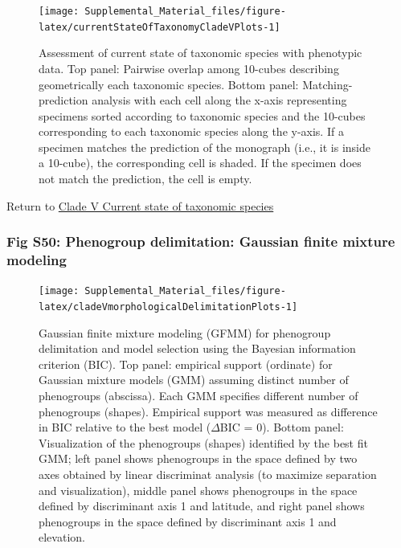 \documentclass[
  11pt,
]{article}
\begin{document}
\begin{figure}
\texttt{[image: Supplemental\_Material\_files/figure-latex/currentStateOfTaxonomyCladeVPlots-1]} \caption{Assessment of current state of taxonomic species with phenotypic data. Top panel: Pairwise overlap among 10-cubes describing geometrically each taxonomic species. Bottom panel: Matching-prediction analysis with each cell along the x-axis representing specimens sorted according to taxonomic species and the 10-cubes corresponding to each taxonomic species along the y-axis. If a specimen matches the prediction of the monograph (i.e., it is inside a 10-cube), the corresponding cell is shaded. If the specimen does not match the prediction, the cell is empty.}\label{fig:currentStateOfTaxonomyCladeVPlots}
\end{figure}

Return to \protect\hyperlink{current-state-of-taxonomic-species-4}{Clade V Current state of taxonomic species}
\pagebreak

\hypertarget{fig-s50-phenogroup-delimitation-gaussian-finite-mixture-modeling}{%
\subsubsection{Fig S50: Phenogroup delimitation: Gaussian finite mixture modeling}\label{fig-s50-phenogroup-delimitation-gaussian-finite-mixture-modeling}}

\begin{figure}
\texttt{[image: Supplemental\_Material\_files/figure-latex/cladeVmorphologicalDelimitationPlots-1]} \caption{Gaussian finite mixture modeling (GFMM) for phenogroup delimitation and model selection using the Bayesian information criterion (BIC). Top panel: empirical support (ordinate) for Gaussian mixture models (GMM) assuming distinct number of phenogroups (abscissa). Each GMM specifies different number of phenogroups (shapes). Empirical support was measured as difference in BIC relative to the best model ($\Delta$BIC = $0$). Bottom panel: Visualization of the phenogroups (shapes) identified by the best fit GMM; left panel shows phenogroups in the space defined by two axes obtained by linear discriminat analysis (to maximize separation and visualization), middle panel shows phenogroups in the space defined by discriminant axis 1 and latitude, and right panel shows phenogroups in the space defined by discriminant axis 1 and elevation.}\label{fig:cladeVmorphologicalDelimitationPlots}
\end{figure}
\end{document}
